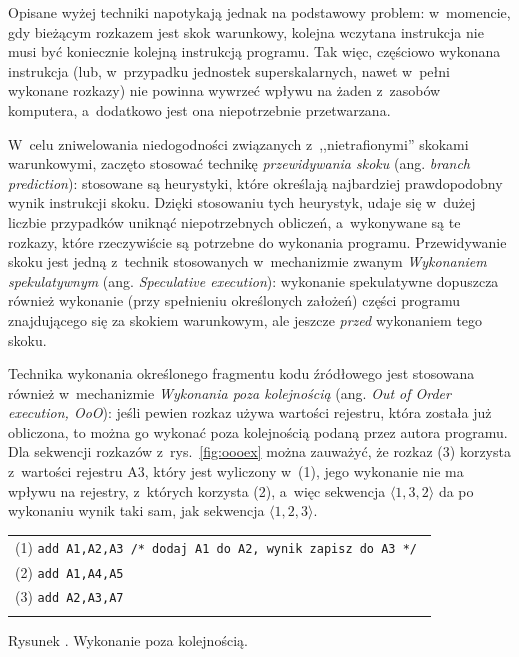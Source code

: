 \documentclass[12pt,makeidx]{mwart}
\newcounter{figmain}
\newcommand{\myfigcounter}[1]{ \begin{center}Rysunek \arabic{figmain}. #1.\end{center} \addtocounter{figmain}{1} }
\begin{document}
%
\indent
	Opisane wyżej techniki napotykają jednak na podstawowy problem: w~momencie, gdy bieżącym rozkazem jest skok warunkowy, kolejna wczytana 
	instrukcja nie musi być koniecznie kolejną instrukcją programu. Tak więc, częściowo wykonana instrukcja (lub, w~przypadku jednostek
	superskalarnych, nawet w~pełni wykonane rozkazy) nie powinna wywrzeć wpływu na żaden z~zasobów komputera, 
	a~dodatkowo jest ona niepotrzebnie przetwarzana.
\par
%
\indent
	W~celu zniwelowania niedogodności związanych z~,,nietrafionymi'' skokami warunkowymi, zaczęto stosować technikę 
	\emph{przewidywania skoku} (ang. \emph{branch prediction}): stosowane są heurystyki, które określają najbardziej prawdopodobny
	wynik instrukcji skoku. Dzięki stosowaniu tych heurystyk, udaje się w~dużej liczbie przypadków uniknąć niepotrzebnych obliczeń,
	a~wykonywane są te rozkazy, które rzeczywiście są potrzebne do wykonania programu.
	Przewidywanie skoku jest jedną z~technik stosowanych w~mechanizmie zwanym \emph{Wykonaniem spekulatywnym} (ang. \emph{Speculative execution}):
	wykonanie spekulatywne dopuszcza również wykonanie (przy spełnieniu określonych założeń) części programu znajdującego się za skokiem warunkowym,
	ale jeszcze \emph{przed} wykonaniem tego skoku.
\par
%
\indent
	Technika wykonania określonego fragmentu kodu źródłowego jest stosowana również w~mechanizmie \emph{Wykonania poza kolejnością}
	(ang. \emph{Out of Order execution, OoO}): jeśli pewien rozkaz używa wartości rejestru, która została już obliczona, to można go wykonać
	poza kolejnością podaną przez autora programu. Dla sekwencji rozkazów z~rys.~\ref{fig:oooex}
	można zauważyć, że rozkaz (3) korzysta z~wartości rejestru A3, który jest wyliczony w~(1), jego wykonanie nie ma wpływu na rejestry, z~których 
	korzysta (2), a~więc sekwencja $\langle 1, 3, 2 \rangle $ da po wykonaniu wynik taki sam, jak sekwencja $\langle 1, 2, 3 \rangle $.
	\begin{center}
	\begin{tabular}{l}\\
		(1) {\tt add A1,A2,A3 /* dodaj A1 do A2, wynik zapisz do A3 */ } \\
		(2) {\tt add A1,A4,A5 } \\
		(3) {\tt add A2,A3,A7 } \\
		\\
	\end{tabular}
  \myfigcounter{Wykonanie poza kolejnością}
	\label{fig:oooex}
	\end{center}
\end{document}

